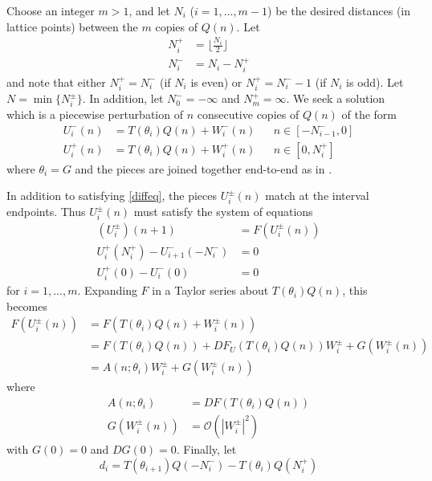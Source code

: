 \documentclass[12pt]{article}
\begin{document}
Choose an integer $m > 1$, and let $N_i$ ($i = 1, \dots, m-1$) be the desired distances (in lattice points) between the $m$ copies of $Q(n)$. Let 
\begin{equation}\label{Nipm}
\begin{aligned}
N_i^+ &= \lfloor \frac{N_i}{2} \rfloor \\
N_i^- &= N_i - N_i^+
\end{aligned}
\end{equation}
and note that either $N_i^+ = N_i^-$ (if $N_i$ is even) or $N_i^+ = N_i^- - 1$ (if $N_i$ is odd). Let $N = \min\{ N_i^\pm \}$. In addition, let $N_0^- = -\infty$ and $N_m^+ = \infty$. We seek a solution which is a piecewise perturbation of $n$ consecutive copies of $Q(n)$ of the form
\begin{align}\label{Upiecewise}
U_i^-(n) &= T(\theta_i) Q(n) + W_i^-(n) && n \in [-N_{i-1}^-, 0] \\
U_i^+(n) &= T(\theta_i) Q(n) + W_i^+(n) && n \in [0, N_i^+]
\end{align}
where $\theta_i = G$ and the pieces are joined together end-to-end as in \cite{Sandstede1998}. 

In addition to satisfying \eqref{diffeq}, the pieces $U_i^\pm(n)$ match at the interval endpoints. Thus $U_i^\pm(n)$ must satisfy the system of equations
\begin{equation}\label{Usystem}
\begin{aligned}
(U_i^\pm)(n+1) &= F(U_i^\pm(n))  \\
U_i^+(N_i^+) - U_{i+1}^-(-N_i^-) &= 0 \\
U_i^+(0) - U_i^-(0) &= 0
\end{aligned}
\end{equation}
for $i = 1, \dots, m$. Expanding $F$ in a Taylor series about $T(\theta_i) Q(n)$, this becomes
\begin{align*}
F(U_i^\pm(n)) &= F(T(\theta_i) Q(n) + W_i^\pm(n)) \\
&= F(T(\theta_i) Q(n)) + DF_{U}(T(\theta_i) Q(n)) W_i^\pm + G(W_i^\pm(n)) \\
&= A(n; \theta_i) W_i^\pm + G(W_i^\pm(n))
\end{align*}
where
\begin{align*}
A(n; \theta_i) &= DF(T(\theta_i) Q(n))\\
G(W_i^\pm(n)) &= \mathcal{O}(|W_i^\pm|^2)
\end{align*}
with $G(0) = 0$ and $DG(0) = 0$. Finally, let 
\begin{equation}\label{defdi}
d_i = T(\theta_{i+1}) Q(-N_i^-) - T(\theta_i) Q(N_i^+)
\end{equation}
\end{document}
